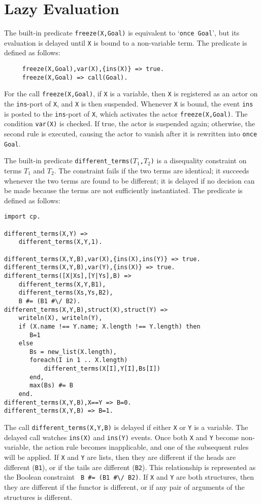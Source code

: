 \section{Lazy Evaluation}
The built-in predicate \texttt{freeze(X,Goal)} is equivalent to `\texttt{once Goal}', but its evaluation is delayed until \texttt{X} is bound to a non-variable term. The predicate is defined as follows:
\begin{verbatim}
     freeze(X,Goal),var(X),{ins(X)} => true.
     freeze(X,Goal) => call(Goal).
\end{verbatim}
For the call \texttt{freeze(X,Goal)}, if  \texttt{X} is a variable, then \texttt{X} is registered as an actor on the \texttt{ins}-port of \texttt{X}, and \texttt{X} is then suspended. Whenever \texttt{X} is bound, the event \texttt{ins} is posted to the \texttt{ins}-port of \texttt{X}, which activates the actor \texttt{freeze(X,Goal)}. The condition \texttt{var(X)} is checked. If true, the actor is suspended again; otherwise, the second rule is executed, causing the actor to vanish after it is rewritten into \texttt{once Goal}.

The built-in predicate \texttt{different\_terms($T_1$,$T_2$)} is a disequality constraint on terms $T_1$ and $T_2$. The constraint fails if the two terms are identical; it succeeds whenever the two terms are found to be different; it is delayed if no decision can be made because the terms are not sufficiently instantiated. The predicate is defined as follows:
\begin{verbatim}
import cp.

different_terms(X,Y) =>
    different_terms(X,Y,1).

different_terms(X,Y,B),var(X),{ins(X),ins(Y)} => true.
different_terms(X,Y,B),var(Y),{ins(X)} => true.
different_terms([X|Xs],[Y|Ys],B) =>
    different_terms(X,Y,B1),
    different_terms(Xs,Ys,B2),
    B #= (B1 #\/ B2).
different_terms(X,Y,B),struct(X),struct(Y) =>
    writeln(X), writeln(Y),											  
    if (X.name !== Y.name; X.length !== Y.length) then
       B=1
    else
       Bs = new_list(X.length),
       foreach(I in 1 .. X.length)
           different_terms(X[I],Y[I],Bs[I])
       end,
       max(Bs) #= B
    end.
different_terms(X,Y,B),X==Y => B=0.
different_terms(X,Y,B) => B=1.
\end{verbatim}
The call \texttt{different\_terms(X,Y,B)} is delayed if either \texttt{X} or \texttt{Y} is a variable. The delayed call watches \texttt{ins(X)} and  \texttt{ins(Y)} events. Once both \texttt{X} and \texttt{Y} become non-variable, the action rule becomes inapplicable, and one of the subsequent rules will be applied. If \texttt{X} and \texttt{Y} are lists, then they are different if the heads are different (\verb+B1+), or if the tails are different (\verb+B2+).  This relationship is represented as the Boolean constraint \verb+ B #= (B1 #\/ B2)+. If \texttt{X} and \texttt{Y} are both structures, then they are different if the functor is different, or if any pair of arguments of the structures is different.


